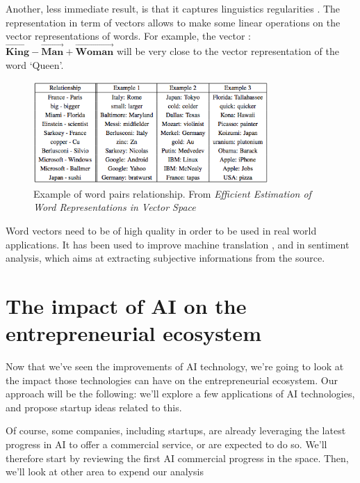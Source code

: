 \documentclass[12pt]{article}
\begin{document}
Another, less immediate result, is that it captures linguistics regularities
\cite{continuousWordVec}. The representation in term of vectors allows to make
some linear operations on the vector representations of words. For example,
the vector : $\vec{\textbf{King}} - \vec{\textbf{Man}} + \vec{\textbf{Woman}}$ will be very close to the vector
representation of the word \lq Queen\rq.

\begin{figure}[ht]
    \centering
    \includegraphics[width=0.8\textwidth]{vectors}
    \caption{Example of word pairs relationship. From {\em Efficient Estimation of Word Representations in
    Vector Space} \cite{wordVec}}
    \label{fig:wordpair}
\end{figure}

Word vectors need to be of high quality in order to be used in real world applications.
It has been used to improve machine translation \cite{translation}, and in sentiment analysis, which aims
at extracting subjective informations from the source.\cite{sentiment}


\pagebreak



\section{The impact of AI on the entrepreneurial ecosystem}

Now that we've seen the improvements of AI technology, we're going to look at
the impact those technologies can have on the entrepreneurial ecosystem.
Our approach will be the following: we'll explore a few applications of AI
technologies, and propose startup ideas related to this.

Of course, some companies, including startups, are already leveraging the latest
progress in AI to offer a commercial service, or are expected to do so.
We'll therefore start by reviewing the first AI commercial progress in the
space. Then, we'll look at other area to expend our analysis
\end{document}
